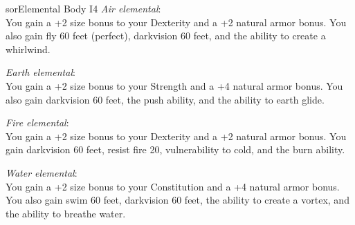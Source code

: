 \begin{spellcard}{sor}{Elemental Body I}{4}
  \vfill{}
  \emph{Air elemental}:\\
  You gain a +2 size bonus to your Dexterity and a +2 natural armor bonus.
  You also gain fly 60 feet (perfect), darkvision 60 feet, and the ability to create a whirlwind.

  \emph{Earth elemental}:\\
  You gain a +2 size bonus to your Strength and a +4 natural armor bonus.
  You also gain darkvision 60 feet, the push ability, and the ability to earth glide.

  \emph{Fire elemental}:\\
  You gain a +2 size bonus to your Dexterity and a +2 natural armor bonus.
  You gain darkvision 60 feet, resist fire 20, vulnerability to cold, and the burn ability.

  \emph{Water elemental}:\\
  You gain a +2 size bonus to your Constitution and a +4 natural armor bonus.
  You also gain swim 60 feet, darkvision 60 feet, the ability to create a vortex, and the ability to breathe water.
  \vfill{}

\end{spellcard}
